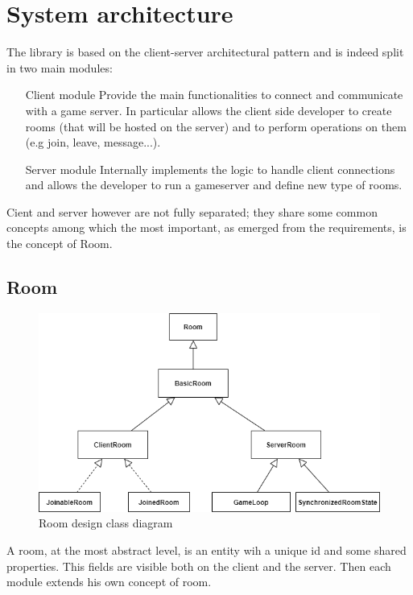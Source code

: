 \chapter{System architecture}
The library is based on the client-server architectural pattern and is indeed split in two main modules: 
\begin{itemize}
	\item[Client module] Provide the main functionalities to connect and communicate with a game server. In particular allows the client side developer to create rooms (that will be hosted on the server) and to perform operations on them (e.g join, leave, message...).
	\item[Server module] Internally implements the logic to handle client connections and allows the developer to run a gameserver and define new type of rooms.
\end{itemize}

Cient and server however are not fully separated; they share some common concepts among which the most important, as emerged from the requirements, is the concept of Room.

\section{Room}
\begin{figure}[H]
	\includegraphics[scale=0.7]{images/3-architecture/room-class.png}
	\caption{Room design class diagram}
	\label{fig:room_classes}
\end{figure}

A room, at the most abstract level, is an entity wih a unique id and some shared properties. This fields are visible both on the client and the server. Then each module extends his own concept of room. 

